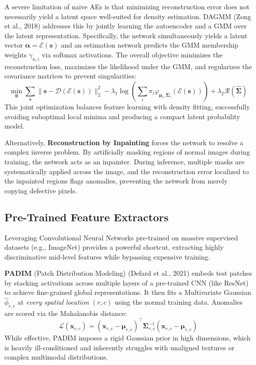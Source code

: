 \begin{insightbox}
A severe limitation of naive AEs is that minimizing reconstruction error does not necessarily yield a latent space well-suited for density estimation. DAGMM (Zong et al., 2018) addresses this by jointly learning the autoencoder and a GMM over the latent representation. Specifically, the network simultaneously yields a latent vector $\boldsymbol{\alpha} = \mathcal{E}(\boldsymbol{s})$ and an estimation network predicts the GMM membership weights $\gamma_{n,i}$ via softmax activations. The overall objective minimizes the reconstruction loss, maximizes the likelihood under the GMM, and regularizes the covariance matrices to prevent singularities:
\begin{equation}
    \min_{\boldsymbol{\theta}} \sum_{\boldsymbol{s}} \| \boldsymbol{s} - \mathcal{D}(\mathcal{E}(\boldsymbol{s})) \|_2^2 - \lambda_1 \log \left( \sum_i \pi_i \varphi_{\boldsymbol{\mu}_i, \boldsymbol{\Sigma}_i}(\mathcal{E}(\boldsymbol{s})) \right) + \lambda_2 \mathcal{R}(\hat{\boldsymbol{\Sigma}})
\end{equation}
This joint optimization balances feature learning with density fitting, successfully avoiding suboptimal local minima and producing a compact latent probability model.
\end{insightbox}

Alternatively, \textbf{Reconstruction by Inpainting} forces the network to resolve a complex inverse problem. By artificially masking regions of normal images during training, the network acts as an inpainter. During inference, multiple masks are systematically applied across the image, and the reconstruction error localized to the inpainted regions flags anomalies, preventing the network from merely copying defective pixels.

\subsection{Pre-Trained Feature Extractors}
Leveraging Convolutional Neural Networks pre-trained on massive supervised datasets (e.g., ImageNet) provides a powerful shortcut, extracting highly discriminative mid-level features while bypassing expensive training.

\textbf{PADIM} (Patch Distribution Modeling) (Defard et al., 2021) embeds test patches by stacking activations across multiple layers of a pre-trained CNN (like ResNet) to achieve fine-grained global representations. It then fits a Multivariate Gaussian $\hat{\phi}_{r,c}$ at \textit{every spatial location} $(r,c)$ using the normal training data. Anomalies are scored via the Mahalanobis distance:
\begin{equation}
    \mathcal{L}(\boldsymbol{x}_{r,c}) = (\boldsymbol{x}_{r,c} - \boldsymbol{\mu}_{r,c})^\top \boldsymbol{\Sigma}_{r,c}^{-1} (\boldsymbol{x}_{r,c} - \boldsymbol{\mu}_{r,c})
\end{equation}
While effective, PADIM imposes a rigid Gaussian prior in high dimensions, which is heavily ill-conditioned and inherently struggles with unaligned textures or complex multimodal distributions.

